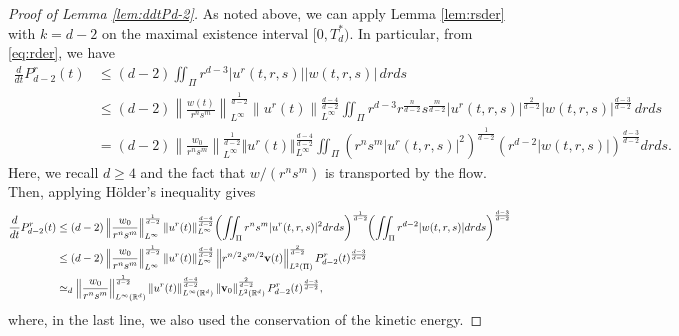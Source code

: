 \documentclass[11pt]{amsart}
\theoremstyle{definition}
\theoremstyle{remark}
\numberwithin{equation}{section}
\numberwithin{equation}{section}
\newcommand{\nrm}[1]{\Vert#1\Vert}
\newcommand{\0}{\emptyset}
\newcommand{\ift}{\infty}
\newcommand{\bfv}{{\bf v}}
\newcommand{\bbR}{\mathbb R}
\begin{document}
	\begin{proof}[Proof of Lemma \ref{lem:ddtPd-2}] As noted above, we can apply Lemma \ref{lem:rsder} with $k=d-2$ on the maximal existence interval $[0,T_d^*)$. In particular, from \eqref{eq:rder}, we have
		\begin{equation}
			\begin{aligned}
				\frac{d}{dt}P_{d-2}^{r}(t)&\leq (d-2)\iint_{\Pi}r^{d-3}|u^{r}(t,r,s)||w(t,r,s)| \,drds\\
				&\le (d-2) \left\| \frac{w(t)}{r^{n}s^{m}}\right\|_{L^{\ift}}^{\frac{1}{d-2}} \left\| u^{r}(t) \right\|_{L^{\ift}}^{\frac{d-4}{d-2}} \iint_{\Pi}r^{d-3}r^{\frac{n}{d-2}}s^{\frac{m}{d-2}}|u^{r}(t,r,s)|^{\frac{2}{d-2}}|w(t,r,s)|^{\frac{d-3}{d-2}} \,drds\\
				&=(d-2) \left\| \frac{w_0}{r^{n}s^{m}}\right\|_{L^{\ift}}^{\frac{1}{d-2}}\nrm{u^{r}(t)}_{L^{\ift}}^{\frac{d-4}{d-2}} \iint_{\Pi} \left(r^{n}s^{m}|u^{r}(t,r,s)|^{2} \right)^{\frac{1}{d-2}} \left(r^{d-2}|w(t,r,s)|\right)^{\frac{d-3}{d-2}}drds.
			\end{aligned}
		\end{equation}
	Here, we recall $d\ge 4$ and the fact that $w/(r^ns^m)$ is transported by the flow. Then, applying H\"{o}lder's inequality gives	
		\begin{equation}
			\begin{aligned}
				\frac{d}{dt}P_{d-2}^{r}(t)&\le (d-2) \left\| \frac{w_0}{r^{n}s^{m}}\right\|_{L^{\ift}}^{\frac{1}{d-2}}\nrm{u^{r}(t)}_{L^{\ift}}^{\frac{d-4}{d-2}} \! \left(\iint_{\Pi}r^{n}s^{m}|u^{r}(t,r,s)|^{2}drds\right)^{\frac{1}{d-2}} \! \! \left( \iint_{\Pi} r^{d-2}|w(t,r,s)|drds\right)^{\frac{d-3}{d-2}}\\
				&\le (d-2) \left\| \frac{w_{0}}{r^{n}s^{m}}\right\|_{L^{\ift}}^{\frac{1}{d-2}}\left\| u^{r}(t) \right\|_{L^{\ift}}^{\frac{d-4}{d-2}}\left\| r^{n/2}s^{m/2}\bfv(t)\right\|_{L^{2}(\Pi)}^{\frac{2}{d-2}}P_{d-2}^{r}(t)^{\frac{d-3}{d-2}}\\
				&\simeq_d \left\| \frac{w_{0}}{r^{n}s^{m}}\right\|_{L^{\ift}(\bbR^{d})}^{\frac{1}{d-2}}\left\|u^{r}(t)\right\|_{L^{\ift}(\bbR^{d})}^{\frac{d-4}{d-2}}\left\| \bfv_{0} \right\|_{L^{2}(\bbR^{d})}^{\frac{2}{d-2}}P_{d-2}^{r}(t)^{\frac{d-3}{d-2}},
			\end{aligned}
		\end{equation}
	where, in the last line, we also used the conservation of the kinetic energy.	
		

\end{proof}
\end{document}
